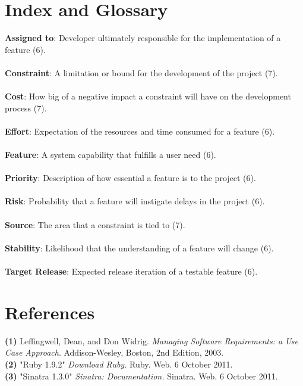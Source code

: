 \documentclass{article}
\begin{document}
\section{Index and Glossary}
\textbf{Assigned to}: Developer ultimately responsible for the implementation of a feature (6).\\ \\
\textbf{Constraint}: A limitation or bound for the development of the project (7).\\ \\
\textbf{Cost}: How big of a negative impact a constraint will have on the development process (7).\\ \\
\textbf{Effort}: Expectation of the resources and time consumed for a feature (6).\\ \\
\textbf{Feature}: A system capability that fulfills a user need (6).\\ \\
\textbf{Priority}: Description of how essential a feature is to the project (6).\\ \\
\textbf{Risk}: Probability that a feature will instigate delays in the project (6).\\ \\
\textbf{Source}: The area that a constraint is tied to (7).\\ \\
\textbf{Stability}: Likelihood that the understanding of a feature will change (6).\\ \\
\textbf{Target Release}: Expected release iteration of a testable feature (6).

\section{References}
\hangindent=1.4cm
\textbf{(1)} Leffingwell, Dean, and Don Widrig.
\emph{Managing Software Requirements: a Use Case Approach}.
Addison-Wesley, Boston,
2nd Edition,
2003.\\

\noindent\hangindent=1.4cm
\textbf{(2)} "Ruby 1.9.2" 
\emph{Download Ruby.} Ruby. Web.  6 October 2011. \\

\noindent\hangindent=1.4cm
\textbf{(3)} "Sinatra 1.3.0" 
\emph{Sinatra: Documentation.} Sinatra. Web.  6 October 2011.\\
\end{document}
